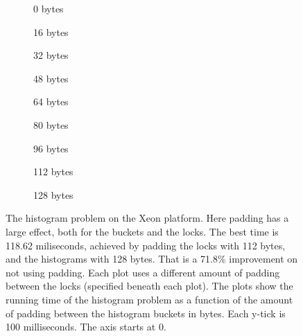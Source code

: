 \begin{figure}[hbpt]
	\graphicspath{{plots/}}
	\begin{subfigure}{0.32\textwidth}
		
		\caption{0 bytes}
	\end{subfigure}
	\begin{subfigure}{0.32\textwidth}
		
		\caption{16 bytes}
	\end{subfigure}
	\begin{subfigure}{0.32\textwidth}
		
		\caption{32 bytes}
	\end{subfigure}
	\begin{subfigure}{0.32\textwidth}
		
		\caption{48 bytes}
	\end{subfigure}
	\begin{subfigure}{0.32\textwidth}
		
		\caption{64 bytes}
	\end{subfigure}
	\begin{subfigure}{0.32\textwidth}
		
		\caption{80 bytes}
	\end{subfigure}
	\begin{subfigure}{0.32\textwidth}
		
		\caption{96 bytes}
	\end{subfigure}
	\begin{subfigure}{0.32\textwidth}
		
		\caption{112 bytes}
	\end{subfigure}
	\begin{subfigure}{0.32\textwidth}
		
		\caption{128 bytes}
	\end{subfigure}
	\caption{The histogram problem on the Xeon platform. Here padding has a
	large effect, both for the buckets and the locks. The best time is
	118.62 miliseconds, achieved by padding the locks with 112 bytes, and
	the histograms with 128 bytes. That is a 71.8\% improvement on not using
	padding.
	Each plot uses a
	different amount of padding between the locks (specified beneath each
	plot). The plots show the running time of the histogram problem as a
	function of the amount of padding between the histogram buckets in
	bytes. Each y-tick is 100 milliseconds. The axis starts at 0.}
	\label{fig:histo-local-xeon}
\end{figure}
